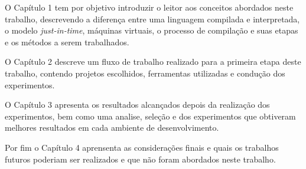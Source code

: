O Capítulo 1 tem por objetivo introduzir o leitor aos conceitos abordados
 neste trabalho, descrevendo a diferença entre uma linguagem compilada e
 interpretada, o modelo \textit{just-in-time}, máquinas virtuais, o processo de compilação
 e suas etapas e os métodos a serem trabalhados.

O Capítulo 2 descreve um fluxo de trabalho realizado para a primeira etapa
 deste trabalho, contendo projetos escolhidos, ferramentas utilizadas e
 condução dos experimentos.

O Capítulo 3 apresenta os resultados alcançados depois da realização dos experimentos,
 bem como uma analise, seleção e dos experimentos que obtiveram melhores resultados
 em cada ambiente de desenvolvimento.
 
Por fim o Capítulo 4 aprensenta as considerações finais e quais os trabalhos futuros
 poderiam ser realizados e que não foram abordados neste trabalho.
